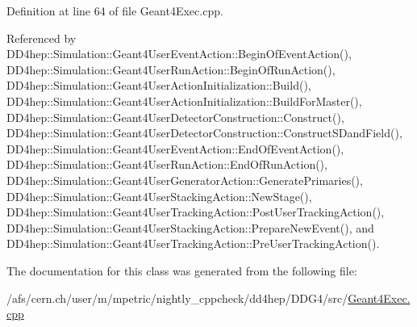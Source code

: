Definition at line 64 of file Geant4\+Exec.\+cpp.



Referenced by D\+D4hep\+::\+Simulation\+::\+Geant4\+User\+Event\+Action\+::\+Begin\+Of\+Event\+Action(), D\+D4hep\+::\+Simulation\+::\+Geant4\+User\+Run\+Action\+::\+Begin\+Of\+Run\+Action(), D\+D4hep\+::\+Simulation\+::\+Geant4\+User\+Action\+Initialization\+::\+Build(), D\+D4hep\+::\+Simulation\+::\+Geant4\+User\+Action\+Initialization\+::\+Build\+For\+Master(), D\+D4hep\+::\+Simulation\+::\+Geant4\+User\+Detector\+Construction\+::\+Construct(), D\+D4hep\+::\+Simulation\+::\+Geant4\+User\+Detector\+Construction\+::\+Construct\+S\+Dand\+Field(), D\+D4hep\+::\+Simulation\+::\+Geant4\+User\+Event\+Action\+::\+End\+Of\+Event\+Action(), D\+D4hep\+::\+Simulation\+::\+Geant4\+User\+Run\+Action\+::\+End\+Of\+Run\+Action(), D\+D4hep\+::\+Simulation\+::\+Geant4\+User\+Generator\+Action\+::\+Generate\+Primaries(), D\+D4hep\+::\+Simulation\+::\+Geant4\+User\+Stacking\+Action\+::\+New\+Stage(), D\+D4hep\+::\+Simulation\+::\+Geant4\+User\+Tracking\+Action\+::\+Post\+User\+Tracking\+Action(), D\+D4hep\+::\+Simulation\+::\+Geant4\+User\+Stacking\+Action\+::\+Prepare\+New\+Event(), and D\+D4hep\+::\+Simulation\+::\+Geant4\+User\+Tracking\+Action\+::\+Pre\+User\+Tracking\+Action().



The documentation for this class was generated from the following file\+:\begin{DoxyCompactItemize}
\item 
/afs/cern.\+ch/user/m/mpetric/nightly\+\_\+cppcheck/dd4hep/\+D\+D\+G4/src/\hyperlink{_geant4_exec_8cpp}{Geant4\+Exec.\+cpp}\end{DoxyCompactItemize}
